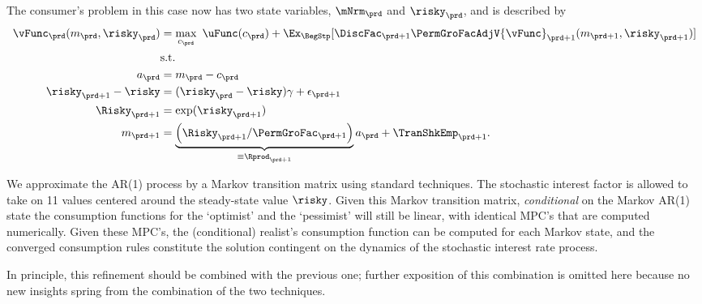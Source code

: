 The consumer's problem in this case now has two state variables, $\mNrm_{\prd}$ and $\risky_{\prd}$, and
is described by
\begin{equation}\begin{gathered}\begin{aligned}
      {\vFunc}_{\prd}({m}_{\prd},\risky_{\prd})  & = \max_{{c}_{\prd}} ~ \uFunc({c}_{\prd})+
      \Ex_{\BegStp}[{\DiscFac}_{\prd+1}\PermGroFacAdjV{\vFunc}_{\prd+1}({m}_{\prd+1},\risky_{\prd+1})] \label{vNormedRisky}
      \\         & \text{s.t.}   \nonumber \\
      {a}_{\prd}    & = {m}_{\prd}-{c}_{\prd} \nonumber
      \\      \risky_{\prd+1}-\risky  & = (\risky_{\prd}-\risky)\gamma + \epsilon_{\prd+1} \notag
      \\      \Risky_{\prd+1}  & = \exp(\risky_{\prd+1}) \notag
      \\      {m}_{\prd+1}  & = \underbrace{\left(\Risky_{\prd+1}/\PermGroFac_{\prd+1}\right)}_{\equiv \Rprod_{\prd+1}}{a}_{\prd}+\TranShkEmp_{\prd+1} \nonumber.
    \end{aligned}\end{gathered}\end{equation}


We approximate the AR(1) process by a Markov transition matrix using standard techniques.  The stochastic interest factor is allowed to take
on 11 values centered around the steady-state value $\risky$.  Given this Markov transition matrix, \textit{conditional} on the Markov AR(1) state the consumption functions for the `optimist' and the `pessimist' will still be linear,
with identical MPC's that are computed numerically.  Given these MPC's, the (conditional) realist's consumption function can be computed for each Markov state, and the converged consumption rules constitute the solution contingent on the dynamics of the stochastic
interest rate process.

In principle, this refinement should be combined with the previous one;
further exposition of this combination is omitted here because no new
insights spring from the combination of the two techniques.



\hypertarget{imposing-artificial-borrowing-constraints}{}
